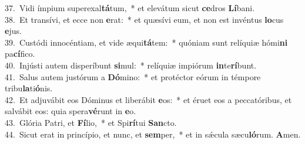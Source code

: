 {37.~}Vidi ímpium superexal\textbf{tá}tum,~* et elevátum sicut \textbf{ce}dros \textbf{Lí}bani.\\
{38.~}Et transívi, et ecce non \textbf{e}rat:~* et quæsívi eum, et non est invéntus \textbf{lo}cus \textbf{e}jus.\\
{39.~}Custódi innocéntiam, et vide æqui\textbf{tá}tem:~* quóniam sunt relíquiæ hómi\textbf{ni} pa\textbf{cí}fico.\\
{40.~}Injústi autem disperíbunt \textbf{si}mul:~* relíquiæ impiórum \textbf{in}te\textbf{rí}bunt.\\
{41.~}Salus autem justórum a \textbf{Dó}mino:~* et protéctor eórum in témpore tribu\textbf{la}ti\textbf{ó}nis.\\
{42.~}Et adjuvábit eos Dóminus et liberábit \textbf{e}os:~* et éruet eos a peccatóribus, et salvábit eos: quia spera\textbf{vé}runt in \textbf{e}o.\\
{43.~}Glória Patri, et \textbf{Fí}lio,~* et Spi\textbf{rí}tui \textbf{San}cto.\\
{44.~}Sicut erat in princípio, et nunc, et \textbf{sem}per,~* et in sǽcula sæcu\textbf{ló}rum. \textbf{A}men.\\

